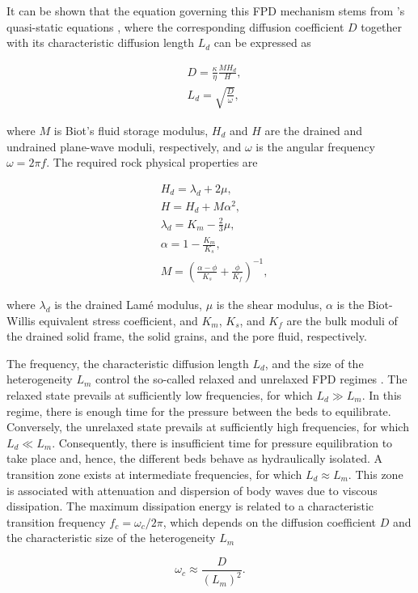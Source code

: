 \documentclass[draft]{agujournal2019}
\begin{document}
It can be shown that the equation governing this FPD mechanism stems from \citeauthor{Biot1941}'s \citeyear{Biot1941} quasi-static equations \cite{Dutta1979, Chandler1981, Norris1993}, where the corresponding diffusion coefficient $D$ together with its characteristic diffusion length $L_d$ can be expressed as \cite{Norris1993}
\begin{linenomath*}
\begin{equation}\label{Eq.3}
\begin{split}
&D= \frac {\kappa} {\eta} \frac{M H_d}{H},\\
&L_d=\sqrt{\frac{D}{\omega}},
\end{split}
\end{equation}
\end{linenomath*}
where $M$ is Biot’s fluid storage modulus, $H_d$ and $H$ are the drained and undrained plane-wave moduli, respectively, and $\omega$ is the angular frequency $\omega = 2 \pi f$.
The required rock physical properties are
\begin{linenomath*}
\begin{equation}\label{Eq.4}
\begin{split}
& H_d = \lambda_d + 2 \mu, \\
& H = H_d + M \alpha ^2, \\
& \lambda_d= K_m - \frac{2}{3} \mu, \\
& \alpha =1-\frac{K_m}{K_s},\\
& M  =\left( \frac{\alpha-\phi}{K_s} +\frac{\phi}{K_f} \right)^{-1},
\end{split}
\end{equation}
\end{linenomath*}
where $\lambda_d$ is the drained Lamé modulus, $\mu$ is the shear modulus, $\alpha$ is the Biot-Willis equivalent stress coefficient, and $K_m$, $K_s$, and $K_f$ are the bulk moduli of the drained solid frame, the solid grains, and the pore fluid, respectively.

The frequency, the characteristic diffusion length $L_d$, and the size of the heterogeneity $L_m$ control the so-called relaxed and unrelaxed FPD regimes \cite{Muller2010}. The relaxed state prevails at sufficiently low frequencies, for which  $L_d \gg L_m$. In this regime, there is enough time for the pressure between the beds to equilibrate. Conversely, the unrelaxed state prevails at sufficiently high frequencies, for which $L_d \ll L_m$. Consequently, there is insufficient time for pressure equilibration to take place and, hence, the different beds behave as hydraulically isolated. A transition zone exists at intermediate frequencies, for which $L_d \approx L_m$.
This zone is associated with attenuation and dispersion of body waves due to viscous dissipation. The maximum dissipation energy is related to a characteristic transition frequency $f_c= \omega_c/2\pi$, which depends on the diffusion coefficient $D$ and the characteristic size of the heterogeneity $L_m$ \cite{Muller2006}
\begin{linenomath*}
\begin{equation}\label{Eq.5}
\omega_c \approx \frac{D}{(L_m)^2}.
\end{equation}
\end{linenomath*}
\end{document}
